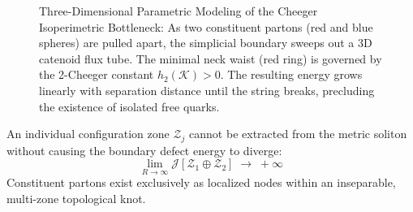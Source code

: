 \documentclass[
    12pt,
    a4paper,
    headings=normal,
    twoside=false,
    open=any,
    parskip=half
]{scrbook}
\begin{document}
\begin{figure}[htbp]
\caption{Three-Dimensional Parametric Modeling of the Cheeger Isoperimetric Bottleneck: As two constituent partons (red and blue spheres) are pulled apart, the simplicial boundary sweeps out a 3D catenoid flux tube. The minimal neck waist (red ring) is governed by the 2-Cheeger constant $h_2(\mathcal{K}) > 0$. The resulting energy grows linearly with separation distance until the string breaks, precluding the existence of isolated free quarks.}
\label{fig:ch3_confinement_flux_tube}
\end{figure}

\begin{phystheorem}\label{thm:ch3_topological_confinement_proof}
An individual configuration zone $\mathcal{Z}_j$ cannot be extracted from the metric soliton without causing the boundary defect energy to diverge:
\begin{equation}
\boxed{\lim_{R \to \infty} \mathcal{J}\left[ \mathcal{Z}_1 \oplus \mathcal{Z}_2 \right] \;\longrightarrow\; +\infty}
\label{eq:ch3_confinement_divergence}
\end{equation}
Constituent partons exist exclusively as localized nodes within an inseparable, multi-zone topological knot.
\end{phystheorem}
\end{document}
